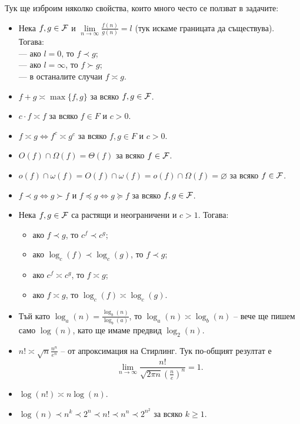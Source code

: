 Тук ще изброим няколко свойства, които много често се ползват в задачите:
\begin{itemize}
  \item Нека $f, g \in \mathcal{F}$ и $\lim\limits_{n \rightarrow \infty} \frac{f(n)}{g(n)} = l$ (тук искаме границата да съществува).
        Тогава: \\
        --- ако $l = 0$, то $f \prec g$; \\
        --- ако $l = \infty$, то $f \succ g$; \\
        --- в останалите случаи $f \asymp g$.
  \item $f + g \asymp \max\{f, g\}$ за всяко $f, g \in \mathcal{F}$.
  \item $c \cdot f \asymp f$ за всяко $f \in F$ и $c > 0$.
  \item $f \asymp g \iff f^c \asymp g^c$ за всяко $f, g \in F$ и $c > 0$.
  \item $O(f) \cap \Omega(f) = \Theta(f)$ за всяко $f \in \mathcal{F}$.
  \item $o(f) \cap \omega(f) = O(f) \cap \omega(f) = o(f) \cap \Omega(f) = \varnothing$ за всяко $f \in \mathcal{F}$.
  \item $f \prec g \iff g \succ f$ и $f \preceq g \iff g \succeq f$ за всяко $f, g \in \mathcal{F}$.
  \item Нека $f, g \in \mathcal{F}$ са растящи и неограничени и $c > 1$. Тогава:
        \begin{itemize}
          \item ако $f \prec g$, то $c^f \prec c^g$;
          \item ако $\log_c(f) \prec \log_c(g)$, то $f \prec g$;
          \item ако $c^f \asymp c^g$, то $f \asymp g$;
          \item ако $f \asymp g$, то $\log_c(f) \asymp \log_c(g)$.
        \end{itemize}
  \item Тъй като $\log_a(n) = \frac{\log_b(n)}{\log_b(a)}$, то $\log_a(n) \asymp \log_b(n)$ -- вече ще пишем само $\log(n)$, като ще имаме предвид $\log_2(n)$.
  \item $n! \asymp \sqrt{n} \frac{n^n}{e^n}$ -- от апроксимация на Стирлинг.
        Тук по-общият резултат е
        \[
          \lim\limits_{n \to \infty} \frac{n!}{\sqrt{2 \pi n} \left( \frac{n}{e} \right)^n} = 1.
        \]
  \item $\log(n!) \asymp n \log(n)$.
  \item $\log(n) \prec n^k \prec 2^n \prec n! \prec n^n \prec 2^{n^2}$ за всяко $k \geq 1$.
\end{itemize}

